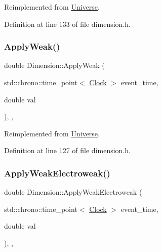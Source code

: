 Reimplemented from \hyperlink{class_universe_af7becebb347be9a85541d96a3eca1ca7}{Universe}.



Definition at line 133 of file dimension.\+h.

\mbox{\label{class_dimension_a72b8ab8d676b4df6b9a6ef948f5693c9}} 
\subsubsection{\texorpdfstring{Apply\+Weak()}{ApplyWeak()}}
{\footnotesize\ttfamily double Dimension\+::\+Apply\+Weak (\begin{DoxyParamCaption}\item[{std\+::chrono\+::time\+\_\+point$<$ \hyperlink{universe_8h_a0ef8d951d1ca5ab3cfaf7ab4c7a6fd80}{Clock} $>$}]{event\+\_\+time,  }\item[{double}]{val }\end{DoxyParamCaption})\hspace{0.3cm}{\ttfamily [inline]}, {\ttfamily [final]}, {\ttfamily [virtual]}}



Reimplemented from \hyperlink{class_universe_a6d1226b3adec3c42a833afdbb6a65a92}{Universe}.



Definition at line 127 of file dimension.\+h.

\mbox{\label{class_dimension_abf490cabd486afa660f17940ed0d17e6}} 
\subsubsection{\texorpdfstring{Apply\+Weak\+Electroweak()}{ApplyWeakElectroweak()}}
{\footnotesize\ttfamily double Dimension\+::\+Apply\+Weak\+Electroweak (\begin{DoxyParamCaption}\item[{std\+::chrono\+::time\+\_\+point$<$ \hyperlink{universe_8h_a0ef8d951d1ca5ab3cfaf7ab4c7a6fd80}{Clock} $>$}]{event\+\_\+time,  }\item[{double}]{val }\end{DoxyParamCaption})\hspace{0.3cm}{\ttfamily [inline]}, {\ttfamily [final]}, {\ttfamily [virtual]}}




